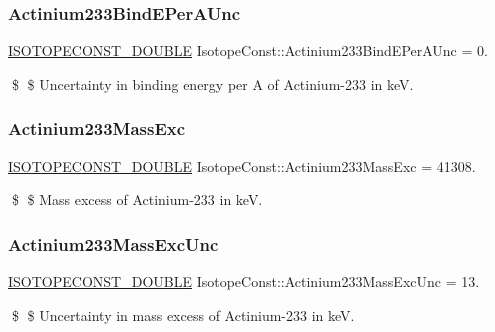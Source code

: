 \subsubsection{\texorpdfstring{Actinium233\+Bind\+E\+Per\+A\+Unc}{Actinium233BindEPerAUnc}}
{\footnotesize\ttfamily \mbox{\hyperlink{group___isotope_const-_macros_ga8f45a7272ce02c0b4c65c44636ed719a}{I\+S\+O\+T\+O\+P\+E\+C\+O\+N\+S\+T\+\_\+\+D\+O\+U\+B\+LE}} Isotope\+Const\+::\+Actinium233\+Bind\+E\+Per\+A\+Unc = 0.}

\$ \$ Uncertainty in binding energy per A of Actinium-\/233 in keV. \mbox{\label{group___isotope_const-_actinium-_ac233_gaddeffa031d6d69185a7522f14c8081ec}} 
\subsubsection{\texorpdfstring{Actinium233\+Mass\+Exc}{Actinium233MassExc}}
{\footnotesize\ttfamily \mbox{\hyperlink{group___isotope_const-_macros_ga8f45a7272ce02c0b4c65c44636ed719a}{I\+S\+O\+T\+O\+P\+E\+C\+O\+N\+S\+T\+\_\+\+D\+O\+U\+B\+LE}} Isotope\+Const\+::\+Actinium233\+Mass\+Exc = 41308.}

\$ \$ Mass excess of Actinium-\/233 in keV. \mbox{\label{group___isotope_const-_actinium-_ac233_ga2d0ab481434a79a8987cbd4a0071cb17}} 
\subsubsection{\texorpdfstring{Actinium233\+Mass\+Exc\+Unc}{Actinium233MassExcUnc}}
{\footnotesize\ttfamily \mbox{\hyperlink{group___isotope_const-_macros_ga8f45a7272ce02c0b4c65c44636ed719a}{I\+S\+O\+T\+O\+P\+E\+C\+O\+N\+S\+T\+\_\+\+D\+O\+U\+B\+LE}} Isotope\+Const\+::\+Actinium233\+Mass\+Exc\+Unc = 13.}

\$ \$ Uncertainty in mass excess of Actinium-\/233 in keV. \mbox{\label{group___isotope_const-_actinium-_ac233_gaf223236e8ed52b39bbc070f0c2dd67b1}} 
